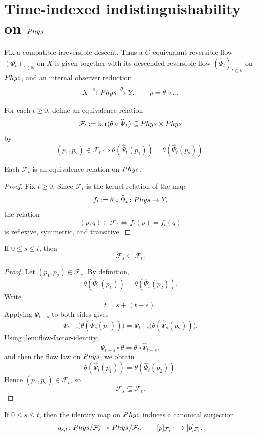 \section{\texorpdfstring{Time-indexed indistinguishability on \(Phys\)}{Time-indexed indistinguishability on Phys}}
Fix a compatible irreversible descent. Thus a
\(G\)-equivariant reversible flow \((\Phi_t)_{t\in\mathbb R}\) on \(X\)
is given together with its descended reversible flow
\((\widehat\Psi_t)_{t\in\mathbb R}\) on \(Phys\), and an internal
observer reduction
\[
	X\xrightarrow{\pi}Phys\xrightarrow{\theta}Y,
	\qquad
	\rho=\theta\circ\pi.
\]
\begin{definition}
	For each \(t\ge0\), define an equivalence relation
	\[
		\mathcal F_t:=\ker(\theta\circ\widehat\Psi_t)
		\subseteq Phys\times Phys
	\]
	by
	\[
		(p_1,p_2)\in \mathcal F_t
		\iff
		\theta(\widehat\Psi_t(p_1))=\theta(\widehat\Psi_t(p_2)).
	\]
\end{definition}
\begin{lemma}[Equivalence]
	Each \(\mathcal F_t\) is an equivalence relation on \(Phys\).
\end{lemma}
\begin{proof}
	Fix \(t\ge0\). Since \(\mathcal F_t\) is the kernel relation of the map
	\[
		f_t:=\theta\circ\widehat\Psi_t\colon Phys\to Y,
	\]
	the relation
	\[
		(p,q)\in\mathcal F_t
		\iff
		f_t(p)=f_t(q)
	\]
	is reflexive, symmetric, and transitive.
\end{proof}
\begin{lemma}
	\label{lem:flow-Ft-monotone}
	If \(0\le s\le t\), then
	\[
		\mathcal F_s\subseteq\mathcal F_t.
	\]
\end{lemma}
\begin{proof}
	Let \((p_1,p_2)\in\mathcal F_s\). By definition,
	\[
		\theta(\widehat\Psi_s(p_1))
		=
		\theta(\widehat\Psi_s(p_2)).
	\]
	Write
	\[
		t=s+(t-s).
	\]
	Applying \(\Psi_{t-s}\) to both sides gives
	\[
		\Psi_{t-s}\bigl(\theta(\widehat\Psi_s(p_1))\bigr)
		=
		\Psi_{t-s}\bigl(\theta(\widehat\Psi_s(p_2))\bigr).
	\]
	Using \cref{lem:flow-factor-identity},
	\[
		\Psi_{t-s}\circ\theta
		=
		\theta\circ\widehat\Psi_{t-s},
	\]
	and then the flow law on \(Phys\), we obtain
	\[
		\theta(\widehat\Psi_t(p_1))
		=
		\theta(\widehat\Psi_t(p_2)).
	\]
	Hence \((p_1,p_2)\in\mathcal F_t\), so
	\[
		\mathcal F_s\subseteq\mathcal F_t.
	\]
\end{proof}
\begin{lemma}
	\label{lem:flow-quotient-surjection}
	If \(0\le s\le t\), then the identity map on \(Phys\) induces a
	canonical surjection
	\[
		q_{s,t}\colon Phys/\mathcal F_s \twoheadrightarrow Phys/\mathcal F_t,
		\qquad
		[p]_{\mathcal F_s}\longmapsto [p]_{\mathcal F_t}.
	\]
\end{lemma}

